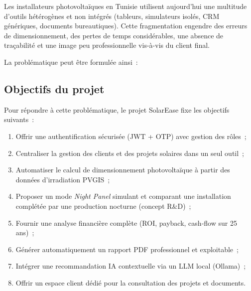 Les installateurs photovoltaïques en Tunisie utilisent aujourd'hui une multitude
d'outils hétérogènes et non intégrés (tableurs, simulateurs isolés, CRM génériques,
documents bureautiques). Cette fragmentation engendre des erreurs de dimensionnement,
des pertes de temps considérables, une absence de traçabilité et une image peu
professionnelle vis-à-vis du client final.

La problématique peut être formulée ainsi~:

\begin{center}
\end{center}

\subsection{Objectifs du projet}

Pour répondre à cette problématique, le projet SolarEase fixe les objectifs suivants~:

\begin{enumerate}
  \item Offrir une authentification sécurisée (JWT + OTP) avec gestion des rôles~;
  \item Centraliser la gestion des clients et des projets solaires dans un seul outil~;
  \item Automatiser le calcul de dimensionnement photovoltaïque à partir des données
    d'irradiation PVGIS~;
  \item Proposer un mode \textit{Night Panel} simulant et comparant une
    installation complétée par une production nocturne (concept R\&D)~;
  \item Fournir une analyse financière complète (ROI, payback, cash-flow sur 25 ans)~;
  \item Générer automatiquement un rapport PDF professionnel et exploitable~;
  \item Intégrer une recommandation IA contextuelle via un LLM local (Ollama)~;
  \item Offrir un espace client dédié pour la consultation des projets et documents.
\end{enumerate}

